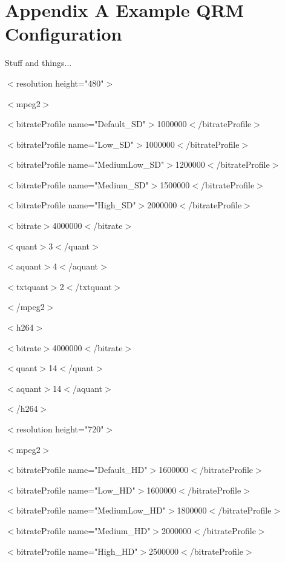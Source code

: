 \documentclass{article}
\begin{document}
\newpage

\appendix

\section{Appendix A\: Example QRM Configuration}
\label{APPENDIX-QRMConfig}

Stuff and things... 
\newline
\newline

$<$resolution height="480"$>$

$<$mpeg2$>$

$<$bitrateProfile name="Default\_SD"$>$1000000$<$/bitrateProfile$>$

$<$bitrateProfile name="Low\_SD"$>$1000000$<$/bitrateProfile$>$

$<$bitrateProfile name="MediumLow\_SD"$>$1200000$<$/bitrateProfile$>$

$<$bitrateProfile name="Medium\_SD"$>$1500000$<$/bitrateProfile$>$

$<$bitrateProfile name="High\_SD"$>$2000000$<$/bitrateProfile$>$

$<$bitrate$>$4000000$<$/bitrate$>$

$<$quant$>$3$<$/quant$>$

$<$aquant$>$4$<$/aquant$>$

$<$txtquant$>$2$<$/txtquant$>$

$<$/mpeg2$>$

$<$h264$>$

$<$bitrate$>$4000000$<$/bitrate$>$

$<$quant$>$14$<$/quant$>$

$<$aquant$>$14$<$/aquant$>$

$<$/h264$>$
\newline
\newline

$<$resolution height="720"$>$

$<$mpeg2$>$

$<$bitrateProfile name="Default\_HD"$>$1600000$<$/bitrateProfile$>$

$<$bitrateProfile name="Low\_HD"$>$1600000$<$/bitrateProfile$>$

$<$bitrateProfile name="MediumLow\_HD"$>$1800000$<$/bitrateProfile$>$

$<$bitrateProfile name="Medium\_HD"$>$2000000$<$/bitrateProfile$>$

$<$bitrateProfile name="High\_HD"$>$2500000$<$/bitrateProfile$>$
\end{document}
